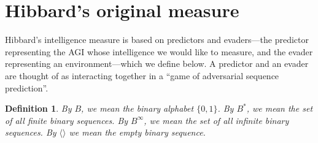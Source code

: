 \documentclass{article}
\newtheorem{definition}{Definition}
\begin{document}
\section{Hibbard's original measure}
\label{originalmeasuresection}

Hibbard's intelligence measure is based on predictors and evaders---the predictor
representing the AGI whose intelligence we would like to measure, and the evader
representing an environment---which we define below. A predictor and an evader
are thought of as interacting together in a ``game of adversarial sequence prediction''.

\begin{definition}
By $B$, we mean the binary alphabet $\{0,1\}$. By $B^*$, we mean the set of all
finite binary sequences. By $B^\infty$, we mean the set of all infinite binary
sequences. By $\langle\rangle$ we mean the empty binary sequence.
\end{definition}
\end{document}
